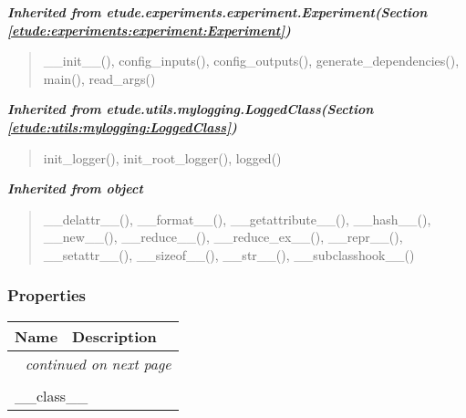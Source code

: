 \large{\textbf{\textit{Inherited from etude.experiments.experiment.Experiment\textit{(Section \ref{etude:experiments:experiment:Experiment})}}}}

\begin{quote}
\_\_init\_\_(), config\_inputs(), config\_outputs(), generate\_dependencies(), main(), read\_args()
\end{quote}

\large{\textbf{\textit{Inherited from etude.utils.mylogging.LoggedClass\textit{(Section \ref{etude:utils:mylogging:LoggedClass})}}}}

\begin{quote}
init\_logger(), init\_root\_logger(), logged()
\end{quote}

\large{\textbf{\textit{Inherited from object}}}

\begin{quote}
\_\_delattr\_\_(), \_\_format\_\_(), \_\_getattribute\_\_(), \_\_hash\_\_(), \_\_new\_\_(), \_\_reduce\_\_(), \_\_reduce\_ex\_\_(), \_\_repr\_\_(), \_\_setattr\_\_(), \_\_sizeof\_\_(), \_\_str\_\_(), \_\_subclasshook\_\_()
\end{quote}


  \subsubsection{Properties}

    \vspace{-1cm}
\hspace{\varindent}\begin{longtable}{|p{\varnamewidth}|p{\vardescrwidth}|l}
\cline{1-2}
\cline{1-2} \centering \textbf{Name} & \centering \textbf{Description}& \\
\cline{1-2}
\endhead\cline{1-2}\multicolumn{3}{r}{\small\textit{continued on next page}}\\\endfoot\cline{1-2}
\endlastfoot\multicolumn{2}{|l|}{\textit{Inherited from object}}\\
\multicolumn{2}{|p{\varwidth}|}{\raggedright \_\_class\_\_}\\
\cline{1-2}
\end{longtable}



